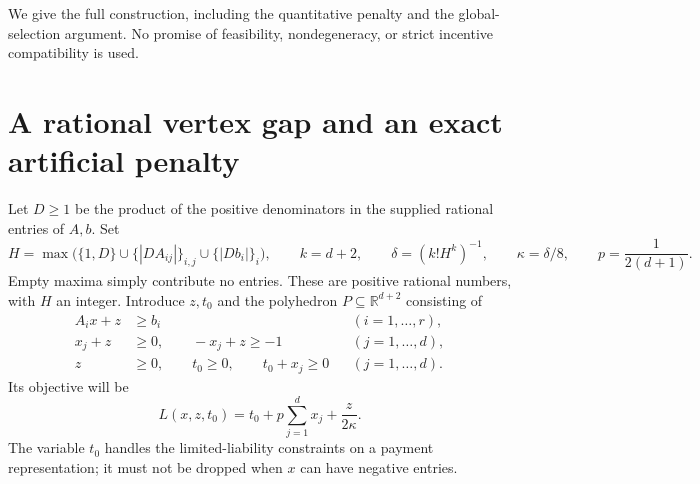 \documentclass[11pt]{article}
\newcommand{\R}{\mathbb R}
\begin{document}
We give the full construction, including the quantitative penalty and the
global-selection argument. No promise of feasibility, nondegeneracy, or
strict incentive compatibility is used.

\section{A rational vertex gap and an exact artificial penalty}
Let \(D\geq1\) be the product of the positive denominators in the supplied
rational entries of \(A,b\). Set
\[
 H=\max\bigl(\{1,D\}\cup\{|DA_{ij}|\}_{i,j}
                         \cup\{|Db_i|\}_i\bigr),\qquad
 k=d+2,\qquad \delta=(k!H^k)^{-1},\qquad
 \kappa=\delta/8,\qquad p=\frac1{2(d+1)}.          \tag{2}
\]
Empty maxima simply contribute no entries. These are positive rational
numbers, with \(H\) an integer. Introduce \(z,t_0\) and the polyhedron
\(P\subseteq\R^{d+2}\) consisting of
\begin{align}
 A_i x+z&\geq b_i &&(i=1,\ldots,r),\nonumber\\
 x_j+z&\geq0,\qquad -x_j+z\geq-1 &&(j=1,\ldots,d),\nonumber\\
 z&\geq0,\qquad t_0\geq0,\qquad t_0+x_j\geq0 &&(j=1,\ldots,d).
                                                        \tag{3}
\end{align}
Its objective will be
\[
 L(x,z,t_0)=t_0+p\sum_{j=1}^d x_j+\frac{z}{2\kappa}. \tag{4}
\]
The variable \(t_0\) handles the limited-liability constraints on a payment
representation; it must not be dropped when \(x\) can have negative entries.
\end{document}
